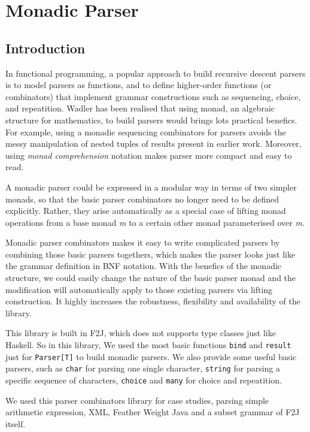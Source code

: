 \chapter{Monadic Parser}

\section{Introduction}

In functional programming, a popular approach to build recursive descent parsers is to model parsers as functions, and to define higher-order functions (or combinators) that implement grammar constructions such as sequencing, choice, and repeatition. Wadler \cite{Wadler:1992} has been realised that using monad, an algebraic structure for mathematics, to build parsers would brings lots practical benefics. For example, using a monadic sequencing combinators for parsers avoids the messy manipulation of nested tuples of results present in earlier work. Moreover, using \textit{monad comprehension} notation makes parser more compact and easy to read.

A monadic parser could be expressed in a modular way in terms of two simpler monads, so that the basic parser combinators no longer need to be defined explicitly. Rather, they arise automatically as a special case of lifting monad operations from a base monad \textit{m} to a certain other monad parameterised over \textit{m}. \cite{Hutton:1996}

Monadic parser combinators makes it easy to write complicated parsers by combining those basic parsers togethers, which makes the parser looks just like the grammar definition in BNF notation. With the benefics of the monadic structure, we could easily change the nature of the basic parser monad and the modification will automatically apply to those existing parsers via lifting construction. It highly increases the robustness, flexibility and availability of the library.

This library is built in F2J, which does not supports type classes just like Haskell. So in this library, We used the most basic functions \texttt{bind} and \texttt{result} just for \texttt{Parser[T]} to build monadic parsers. We also provide some useful basic parsers, such as \texttt{char} for parsing one single character, \texttt{string} for parsing a specific sequence of characters, \texttt{choice} and \texttt{many} for choice and repeatition.

We used this parser combinators library for case studies, parsing simple arithmetic expression, XML, Feather Weight Java and a subset grammar of F2J itself.


